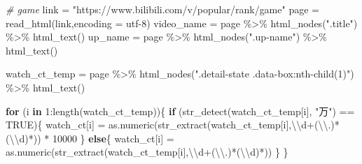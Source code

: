 \documentclass[
]{article}
\newenvironment{Shaded}{\begin{snugshade}}{\end{snugshade}}
\newcommand{\AttributeTok}[1]{\textcolor[rgb]{0.77,0.63,0.00}{#1}}
\newcommand{\CommentTok}[1]{\textcolor[rgb]{0.56,0.35,0.01}{\textit{#1}}}
\newcommand{\ConstantTok}[1]{\textcolor[rgb]{0.00,0.00,0.00}{#1}}
\newcommand{\ControlFlowTok}[1]{\textcolor[rgb]{0.13,0.29,0.53}{\textbf{#1}}}
\newcommand{\DecValTok}[1]{\textcolor[rgb]{0.00,0.00,0.81}{#1}}
\newcommand{\FunctionTok}[1]{\textcolor[rgb]{0.00,0.00,0.00}{#1}}
\newcommand{\NormalTok}[1]{#1}
\newcommand{\OtherTok}[1]{\textcolor[rgb]{0.56,0.35,0.01}{#1}}
\newcommand{\SpecialCharTok}[1]{\textcolor[rgb]{0.00,0.00,0.00}{#1}}
\newcommand{\StringTok}[1]{\textcolor[rgb]{0.31,0.60,0.02}{#1}}
\begin{document}
\begin{Shaded}
\begin{Highlighting}[]
\CommentTok{\# game}
\NormalTok{link }\OtherTok{=} \StringTok{"https://www.bilibili.com/v/popular/rank/game"}
\NormalTok{page }\OtherTok{=} \FunctionTok{read\_html}\NormalTok{(link,}\AttributeTok{encoding =} \StringTok{\textquotesingle{}utf{-}8\textquotesingle{}}\NormalTok{)}
\NormalTok{video\_name }\OtherTok{=}\NormalTok{ page }\SpecialCharTok{\%\textgreater{}\%} \FunctionTok{html\_nodes}\NormalTok{(}\StringTok{".title"}\NormalTok{) }\SpecialCharTok{\%\textgreater{}\%} \FunctionTok{html\_text}\NormalTok{()}
\NormalTok{up\_name }\OtherTok{=}\NormalTok{ page }\SpecialCharTok{\%\textgreater{}\%} \FunctionTok{html\_nodes}\NormalTok{(}\StringTok{".up{-}name"}\NormalTok{) }\SpecialCharTok{\%\textgreater{}\%} \FunctionTok{html\_text}\NormalTok{()}

\NormalTok{watch\_ct\_temp }\OtherTok{=}\NormalTok{ page }\SpecialCharTok{\%\textgreater{}\%} \FunctionTok{html\_nodes}\NormalTok{(}\StringTok{".detail{-}state .data{-}box:nth{-}child(1)"}\NormalTok{) }\SpecialCharTok{\%\textgreater{}\%} \FunctionTok{html\_text}\NormalTok{()}

\ControlFlowTok{for}\NormalTok{ (i }\ControlFlowTok{in} \DecValTok{1}\SpecialCharTok{:}\FunctionTok{length}\NormalTok{(watch\_ct\_temp))\{}
  \ControlFlowTok{if}\NormalTok{ (}\FunctionTok{str\_detect}\NormalTok{(watch\_ct\_temp[i], }\StringTok{"万"}\NormalTok{) }\SpecialCharTok{==} \ConstantTok{TRUE}\NormalTok{)\{}
\NormalTok{    watch\_ct[i] }\OtherTok{=} \FunctionTok{as.numeric}\NormalTok{(}\FunctionTok{str\_extract}\NormalTok{(watch\_ct\_temp[i],}\StringTok{\textquotesingle{}}\SpecialCharTok{\textbackslash{}\textbackslash{}}\StringTok{d+(}\SpecialCharTok{\textbackslash{}\textbackslash{}}\StringTok{.)*(}\SpecialCharTok{\textbackslash{}\textbackslash{}}\StringTok{d)*\textquotesingle{}}\NormalTok{)) }\SpecialCharTok{*} \DecValTok{10000}
\NormalTok{  \}}
  \ControlFlowTok{else}\NormalTok{\{}
\NormalTok{    watch\_ct[i] }\OtherTok{=} \FunctionTok{as.numeric}\NormalTok{(}\FunctionTok{str\_extract}\NormalTok{(watch\_ct\_temp[i],}\StringTok{\textquotesingle{}}\SpecialCharTok{\textbackslash{}\textbackslash{}}\StringTok{d+(}\SpecialCharTok{\textbackslash{}\textbackslash{}}\StringTok{.)*(}\SpecialCharTok{\textbackslash{}\textbackslash{}}\StringTok{d)*\textquotesingle{}}\NormalTok{))}
\NormalTok{  \}}
\NormalTok{\}}



\end{Highlighting}
\end{Shaded}
\end{document}
